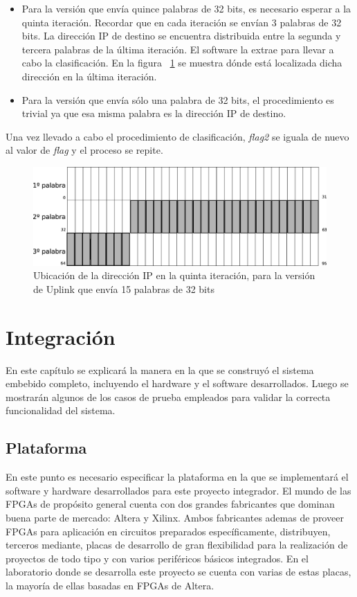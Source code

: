 \begin{itemize}
	\item Para la versión que envía quince palabras de 32 bits, es necesario esperar a la quinta iteración. Recordar que en cada iteración se envían 3 palabras de 32 bits. La dirección IP de destino se encuentra distribuida entre la segunda y tercera palabras de la última iteración. El software la extrae para llevar a cabo la clasificación. En la figura ~\ref{fig:ip15pal} se muestra dónde está localizada dicha dirección en la última iteración.
	\item Para la versión que envía sólo una palabra de 32 bits, el procedimiento es trivial ya que esa misma palabra es la dirección IP de destino.
\end{itemize}


Una vez llevado a cabo el procedimiento de clasificación, \textit{flag2} se iguala de nuevo al valor de \textit{flag }y el proceso se repite.


\begin{figure}[H]
  \centering
	\includegraphics[scale=0.25]{4-implementacion/graf/ip15pal.eps}
  \caption{Ubicación de la dirección IP en la quinta iteración, para la versión de Uplink que envía 15 palabras de 32 bits}
  \label{fig:ip15pal}
\end{figure}

\chapter{Integración}

En este capítulo se explicará la manera en la que se construyó el sistema embebido completo, incluyendo el hardware y el software desarrollados. Luego se mostrarán algunos de los casos de prueba empleados para validar la correcta funcionalidad del sistema.

\section{Plataforma}

En este punto es necesario especificar la plataforma en la que se implementará el software y hardware desarrollados para este proyecto integrador. El mundo de las FPGAs de propósito general cuenta con dos grandes fabricantes que dominan buena parte de mercado: Altera y Xilinx. Ambos fabricantes ademas de proveer FPGAs para aplicación en circuitos preparados específicamente, distribuyen, terceros mediante, placas de desarrollo de gran flexibilidad para la realización de proyectos de todo tipo y con varios periféricos básicos integrados. En el laboratorio donde se desarrolla este proyecto se cuenta con varias de estas placas, la mayoría de ellas basadas en FPGAs de Altera. 


